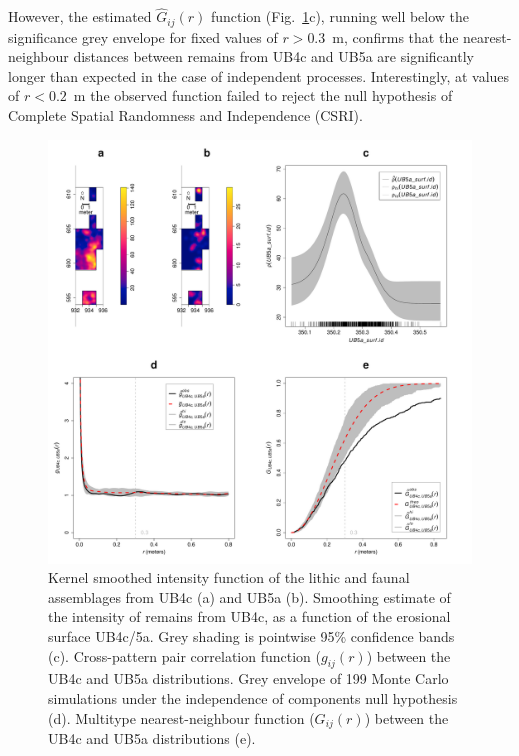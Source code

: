 \documentclass[preprint,authoryear,times]{elsarticle} %
\begin{document}
However, the estimated $\hat{G}_{ij}(r)$ function (Fig.~\ref{fig:12}c), running well below the significance grey envelope for fixed values of $r>0.3$~m, confirms that the nearest-neighbour distances between remains from UB4c and UB5a are significantly longer than expected in the case of independent processes. Interestingly, at values of $r<0.2$~m the observed function failed to reject the null hypothesis of Complete Spatial Randomness and Independence (CSRI).

\begin{figure}[]
  \centering
  \includegraphics[width=1\textwidth]{../artwork/Fig12.pdf}
  \caption{Kernel smoothed intensity function of the lithic and faunal assemblages from UB4c (a) and UB5a (b). Smoothing estimate of the intensity of remains from UB4c, as a function of the erosional surface UB4c/5a. Grey shading is pointwise 95\% confidence bands (c). Cross-pattern pair correlation function ($g_{ij}(r)$) between the UB4c and UB5a distributions. Grey envelope of 199 Monte Carlo simulations under the independence of components null hypothesis (d). Multitype nearest-neighbour function ($G_{ij}(r)$) between the UB4c and UB5a distributions (e).}
  \label{fig:12}
\end{figure}
\end{document}
